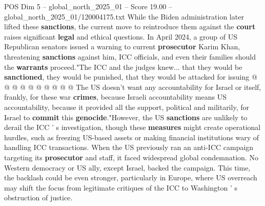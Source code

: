 \begin{textsample}{POS Dim 5 – global\_north\_2025\_01 – Score 19.00 – global\_north\_2025\_01/120004175.txt}
While the Biden administration later lifted these \textbf{sanctions}, the current move to reintroduce them against the \textbf{court} raises significant \textbf{legal} and ethical questions.
In April 2024, a group of US Republican senators issued a warning to current \textbf{prosecutor} Karim Khan, threatening \textbf{sanctions} against him, ICC officials, and even their families should the \textbf{warrants} proceed."The ICC and the judges knew... that they would be \textbf{sanctioned}, they would be punished, that they would be attacked for issuing @ @ @ @ @ @ @ @ @ @ The US doesn't want any accountability for Israel or itself, frankly, for these war \textbf{crimes}, because Israeli accountability means US accountability, because it provided all the support, political and militarily, for Israel to \textbf{commit} this \textbf{genocide}."However, the US \textbf{sanctions} are unlikely to derail the ICC ' s investigation, though these \textbf{measures} might create operational hurdles, such as freezing US-based assets or making financial institutions wary of handling ICC transactions.
When the US previously ran an anti-ICC campaign targeting its \textbf{prosecutor} and staff, it faced widespread global condemnation.
No Western democracy or US ally, except Israel, backed the campaign.
This time, the backlash could be even stronger, particularly in Europe, where US overreach may shift the focus from legitimate critiques of the ICC to Washington ' s obstruction of justice.

\end{textsample}
